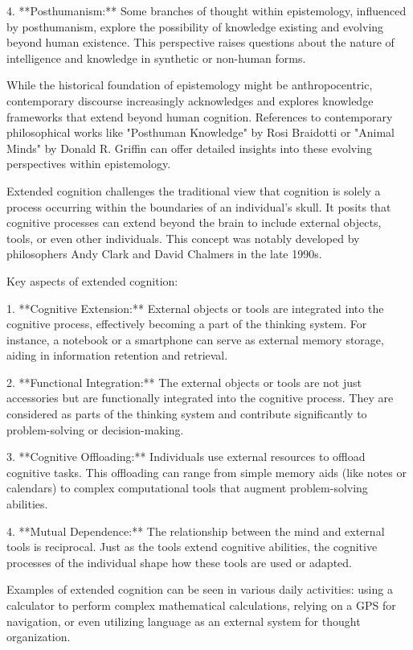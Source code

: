 \documentclass[10pt,titlepage]{book}
\begin{document}
4. **Posthumanism:** Some branches of thought within epistemology, influenced by posthumanism, explore the possibility of knowledge existing and evolving beyond human existence. This perspective raises questions about the nature of intelligence and knowledge in synthetic or non-human forms.

While the historical foundation of epistemology might be anthropocentric, contemporary discourse increasingly acknowledges and explores knowledge frameworks that extend beyond human cognition. References to contemporary philosophical works like "Posthuman Knowledge" by Rosi Braidotti or "Animal Minds" by Donald R. Griffin can offer detailed insights into these evolving perspectives within epistemology.

Extended cognition challenges the traditional view that cognition is solely a process occurring within the boundaries of an individual's skull. It posits that cognitive processes can extend beyond the brain to include external objects, tools, or even other individuals. This concept was notably developed by philosophers Andy Clark and David Chalmers in the late 1990s.

Key aspects of extended cognition:

1. **Cognitive Extension:** External objects or tools are integrated into the cognitive process, effectively becoming a part of the thinking system. For instance, a notebook or a smartphone can serve as external memory storage, aiding in information retention and retrieval.

2. **Functional Integration:** The external objects or tools are not just accessories but are functionally integrated into the cognitive process. They are considered as parts of the thinking system and contribute significantly to problem-solving or decision-making.

3. **Cognitive Offloading:** Individuals use external resources to offload cognitive tasks. This offloading can range from simple memory aids (like notes or calendars) to complex computational tools that augment problem-solving abilities.

4. **Mutual Dependence:** The relationship between the mind and external tools is reciprocal. Just as the tools extend cognitive abilities, the cognitive processes of the individual shape how these tools are used or adapted.

Examples of extended cognition can be seen in various daily activities: using a calculator to perform complex mathematical calculations, relying on a GPS for navigation, or even utilizing language as an external system for thought organization.
\end{document}
